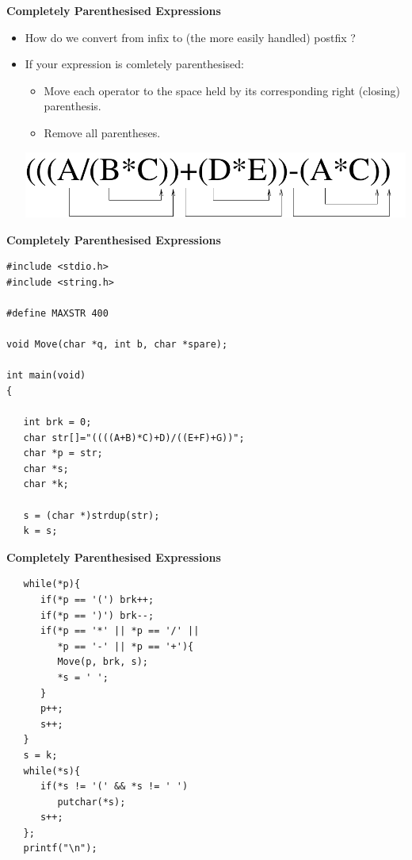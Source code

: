 \documentclass[a4,portraitt]{slides}
\begin{document}
{\newpage
{\samepage
\begin{center}
{\Large{\bf Completely Parenthesised Expressions}}
\end{center}
\begin{itemize}
\item How do we convert from infix to (the more
easily handled) postfix ?
\item If your expression is comletely parenthesised:
\begin{itemize}
\item Move each operator to the space held by its
corresponding right (closing) parenthesis.
\item Remove all parentheses.
\end{itemize}
\begin{center}
\includegraphics{../Images/cmplte.pdf}
\end{center}
\end{itemize}
}

\newpage
{\samepage
\begin{center}
{\Large{\bf Completely Parenthesised Expressions}}
\end{center}
{\small
\begin{verbatim}
#include <stdio.h>
#include <string.h>

#define MAXSTR 400

void Move(char *q, int b, char *spare);

int main(void)
{

   int brk = 0;
   char str[]="((((A+B)*C)+D)/((E+F)+G))";
   char *p = str;
   char *s;
   char *k;

   s = (char *)strdup(str);
   k = s;
\end{verbatim}
}}

\newpage
{\samepage
\begin{center}
{\Large{\bf Completely Parenthesised Expressions}}
\end{center}
{\small
\begin{verbatim}
   while(*p){
      if(*p == '(') brk++;
      if(*p == ')') brk--;
      if(*p == '*' || *p == '/' ||
         *p == '-' || *p == '+'){
         Move(p, brk, s);
         *s = ' ';
      }
      p++;
      s++;
   }
   s = k;
   while(*s){
      if(*s != '(' && *s != ' ')
         putchar(*s);
      s++;
   };
   printf("\n");


\end{verbatim}}}}
\end{document}
